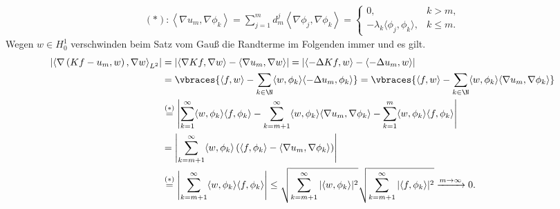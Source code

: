 \begin{solution}
  \begin{align*}
      (*): \left\langle \nabla u_m, \nabla \phi_k \right\rangle = \sum_{j = 1}^m d_m^j \left\langle \nabla \phi_j, \nabla \phi_k\right\rangle = \begin{cases}
          0, & k > m, \\
          - \lambda_k \langle \phi_j, \phi_k \rangle, & k \leq m.
      \end{cases}
  \end{align*}
  Wegen $w \in H_0^1$ verschwinden beim Satz vom Gauß die Randterme im Folgenden immer und es gilt.
	\begin{align*}
	  \left| \left\langle \nabla\left(Kf - u_m, w\right), \nabla w \right\rangle_{L^2} \right| &= \left| \left\langle \nabla Kf, \nabla w \right\rangle - \langle \nabla u_m, \nabla w \rangle \right| = \left| \left\langle -\Delta Kf, w \right\rangle - \langle - \Delta u_m,  w \rangle \right| \\
	  &= \vbraces{\left\langle f, w \right\rangle - \sum_{k \in \N} \langle w, \phi_k \rangle \langle -\Delta u_m, \phi_k \rangle} = \vbraces{\left\langle f, w \right\rangle - \sum_{k \in \N} \langle w, \phi_k \rangle \langle \nabla u_m, \nabla \phi_k \rangle} \\
	  &\stackrel{(\ast)}{=} \left| \sum_{k = 1}^\infty \langle w, \phi_k \rangle \langle f, \phi_k \rangle - \sum_{k = m+1}^\infty \langle w, \phi_k \rangle \langle \nabla u_m, \nabla \phi_k\rangle - \sum_{k = 1}^m \langle w, \phi_k \rangle \langle f, \phi_k \rangle \right|\\
	  &= \left| \sum_{k = m+1}^\infty \langle w, \phi_k \rangle \left(\langle f, \phi_k \rangle - \langle \nabla u_m, \nabla \phi_k \rangle \right)\right|\\
	  &\stackrel{(\ast)}{=} \left| \sum_{k = m+1}^\infty \langle w, \phi_k \rangle \langle f, \phi_k \rangle \right|
	  \leq \sqrt{ \sum_{k = m+1}^\infty |\langle w, \phi_k \rangle|^2} \sqrt{ \sum_{k = m+1}^\infty |\langle f, \phi_k \rangle|^2} \xrightarrow{m \rightarrow \infty} 0.
	\end{align*}
\end{solution}

